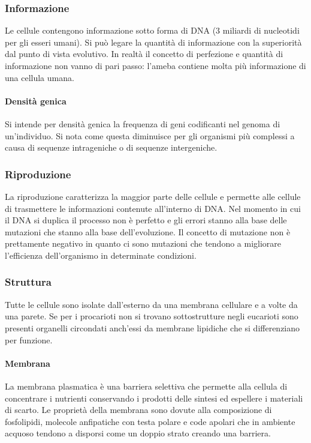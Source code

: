 \subsubsection{Informazione}
Le cellule contengono informazione sotto forma di DNA ($3$ miliardi di nucleotidi per gli esseri umani). Si pu\`o legare la quantit\`a di informazione con la superiorit\`a dal punto di 
vista evolutivo. In realt\`a il concetto di perfezione e quantit\`a di informazione non vanno di pari passo: l'ameba contiene molta pi\`u informazione di una cellula umana. 

	\paragraph{Densit\`a genica}
	Si intende per densit\`a genica la frequenza di geni codificanti nel genoma di un'individuo.
	Si nota come questa diminuisce per gli organismi pi\`u complessi a causa di sequenze intrageniche o di sequenze intergeniche.
\subsubsection{Riproduzione}
La riproduzione caratterizza la maggior parte delle cellule e permette alle cellule di trasmettere le informazioni contenute all'interno di DNA. Nel momento in cui il DNA si duplica il 
processo non \`e perfetto e gli errori stanno alla base delle mutazioni che stanno alla base dell'evoluzione. Il concetto di mutazione non \`e prettamente negativo in quanto ci sono 
mutazioni che tendono a migliorare l'efficienza dell'organismo in determinate condizioni.
\subsubsection{Struttura}
Tutte le cellule sono isolate dall'esterno da una membrana cellulare e a volte da una parete. Se per i procarioti non si trovano sottostrutture negli eucarioti sono presenti organelli
circondati anch'essi da membrane lipidiche che si differenziano per funzione.
\paragraph{Membrana}
La membrana plasmatica \`e una barriera selettiva che permette alla cellula di concentrare i nutrienti conservando i prodotti delle sintesi ed espellere i materiali di scarto. Le 
propriet\`a della membrana sono dovute alla composizione di fosfolipidi, molecole anfipatiche con testa polare e code apolari che in ambiente acquoso tendono a disporsi come un doppio
strato creando una barriera.
